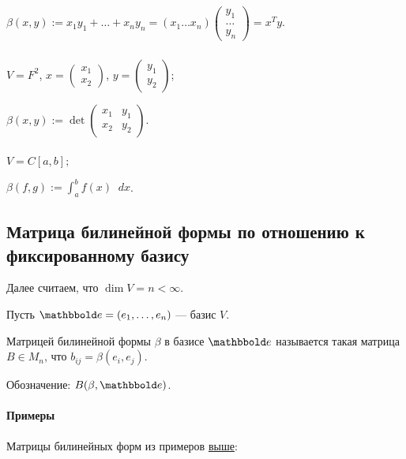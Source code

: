 $\beta(x, y) := x_1 y_1 + \dots + x_n y_n = (x_1 \dots x_n) \begin{pmatrix} y_1 \\ \dots \\ y_n \end{pmatrix} = x^{T} y$.

\subsubsection{}

$V = F^2$, $x = \begin{pmatrix} x_1 \\ x_2 \end{pmatrix}$, $y = \begin{pmatrix} y_1 \\ y_2 \end{pmatrix}$;

$\beta(x, y) := \det \begin{pmatrix} x_1 & y_1 \\ x_2 & y_2 \end{pmatrix}$.

\subsubsection{}

$V = C[a, b];$

$\beta(f, g) := \displaystyle\int^b_a f(x) \mathop{}\!d x$.


\subsection{Матрица билинейной формы по отношению к фиксированному базису}

Далее считаем, что $\dim V = n < \infty$.

Пусть $\E = (e_1, \dots, e_n)$ --- базис $V$.

\begin{definition}
    Матрицей билинейной формы $\beta$ в базисе $\E$ называется такая матрица $B \in M_n$, что $b_{ij} = \beta(e_i, e_j)$.

    Обозначение: $B(\beta, \E)$.
\end{definition}

\paragraph{Примеры}
Матрицы билинейных форм из примеров \hyperref[lec19:bilinear_examples]{выше}:

